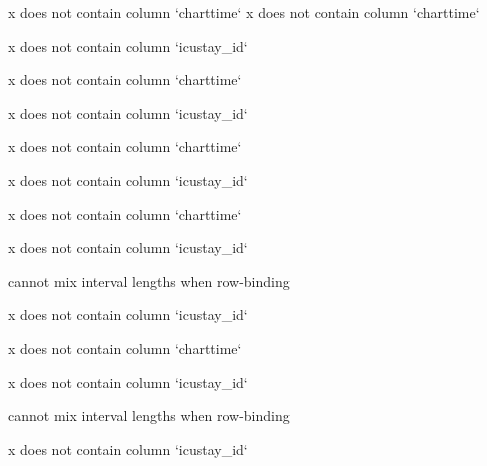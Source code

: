 \documentclass[
]{jss}
\begin{document}
\begin{CodeChunk}
\begin{CodeOutput}
x does not contain column `charttime`
x does not contain column `charttime`
\end{CodeOutput}

\begin{CodeOutput}
x does not contain column `icustay_id`
\end{CodeOutput}

\begin{CodeOutput}
x does not contain column `charttime`
\end{CodeOutput}

\begin{CodeOutput}
x does not contain column `icustay_id`
\end{CodeOutput}

\begin{CodeOutput}
x does not contain column `charttime`
\end{CodeOutput}

\begin{CodeOutput}
x does not contain column `icustay_id`
\end{CodeOutput}

\begin{CodeOutput}
x does not contain column `charttime`
\end{CodeOutput}

\begin{CodeOutput}
x does not contain column `icustay_id`
\end{CodeOutput}

\begin{CodeOutput}
cannot mix interval lengths when row-binding
\end{CodeOutput}

\begin{CodeOutput}
x does not contain column `icustay_id`
\end{CodeOutput}

\begin{CodeOutput}
x does not contain column `charttime`
\end{CodeOutput}

\begin{CodeOutput}
x does not contain column `icustay_id`
\end{CodeOutput}

\begin{CodeOutput}
cannot mix interval lengths when row-binding
\end{CodeOutput}

\begin{CodeOutput}
x does not contain column `icustay_id`
\end{CodeOutput}


\end{CodeChunk}
\end{document}
